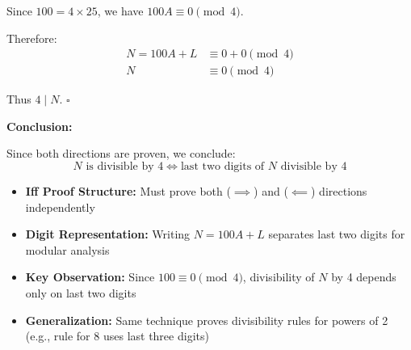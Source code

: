 \begin{solution}
Since $100 = 4 \times 25$, we have $100A \equiv 0 \pmod{4}$.

Therefore:
\begin{align*}
    N = 100A + L &\equiv 0 + 0 \pmod{4} \\
    N &\equiv 0 \pmod{4}
\end{align*}

Thus $4 \mid N$. \hfill $\square$

\vspace{0.5em}
\textbf{Conclusion:}

Since both directions are proven, we conclude:
\[ N \text{ is divisible by } 4 \iff \text{last two digits of } N \text{ divisible by } 4 \]
\end{solution}

\begin{takeaways}
\begin{itemize}
\item \textbf{Iff Proof Structure:} Must prove both ($\implies$) and ($\impliedby$) directions independently
\item \textbf{Digit Representation:} Writing $N = 100A + L$ separates last two digits for modular analysis
\item \textbf{Key Observation:} Since $100 \equiv 0 \pmod{4}$, divisibility of $N$ by 4 depends only on last two digits
\item \textbf{Generalization:} Same technique proves divisibility rules for powers of 2 (e.g., rule for 8 uses last three digits)
\end{itemize}
\end{takeaways}
